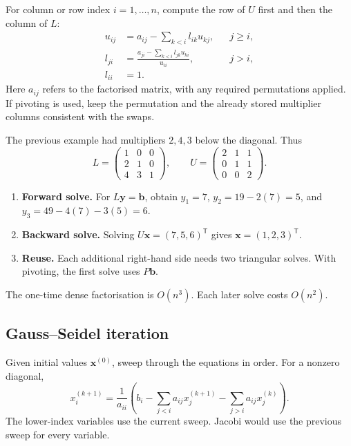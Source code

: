 \documentclass[12pt,a4paper]{article}
\begin{document}
\begin{tcolorbox}[formulabox, title={Doolittle entry formulas}]
For column or row index $i=1,\ldots,n$, compute the row of $U$ first and then the column of $L$:
\[
\begin{aligned}
u_{ij}&=a_{ij}-\sum_{k<i} l_{ik}u_{kj}, && j\ge i,\\
l_{ji}&=\frac{a_{ji}-\sum_{k<i}l_{jk}u_{ki}}{u_{ii}}, && j>i,\\
l_{ii}&=1.
\end{aligned}
\]
Here $a_{ij}$ refers to the factorised matrix, with any required permutations applied. If pivoting is used, keep the permutation and the already stored multiplier columns consistent with the swaps.
\end{tcolorbox}

\begin{tcolorbox}[examplebox, title={Reuse the Gauss multipliers to solve the same system}]
The previous example had multipliers $2,4,3$ below the diagonal. Thus
\[
L=\begin{pmatrix}1&0&0\\2&1&0\\4&3&1\end{pmatrix},
\qquad
U=\begin{pmatrix}2&1&1\\0&1&1\\0&0&2\end{pmatrix}.
\]
\begin{enumerate}[leftmargin=*, itemsep=3pt, topsep=4pt]
  \item \textbf{Forward solve.} For $L\mathbf{y}=\mathbf{b}$, obtain $y_1=7$, $y_2=19-2(7)=5$, and $y_3=49-4(7)-3(5)=6$.
  \item \textbf{Backward solve.} Solving $U\mathbf{x}=(7,5,6)^{\mathsf T}$ gives $\mathbf{x}=(1,2,3)^{\mathsf T}$.
  \item \textbf{Reuse.} Each additional right-hand side needs two triangular solves. With pivoting, the first solve uses $P\mathbf{b}$.
\end{enumerate}
The one-time dense factorisation is $O(n^3)$. Each later solve costs $O(n^2)$.
\end{tcolorbox}

\subsection{Gauss--Seidel iteration}
\begin{tcolorbox}[formulabox, title={Use fresh values immediately}]
Given initial values $\mathbf{x}^{(0)}$, sweep through the equations in order. For a nonzero diagonal,
\[
x_i^{(k+1)}=\frac{1}{a_{ii}}
 \left(b_i-\sum_{j<i}a_{ij}x_j^{(k+1)}
           -\sum_{j>i}a_{ij}x_j^{(k)}\right).
\]
The lower-index variables use the current sweep. Jacobi would use the previous sweep for every variable.
\end{tcolorbox}
\end{document}
